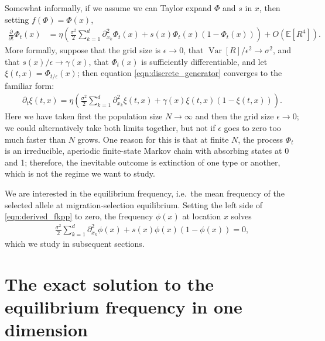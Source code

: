 \documentclass{article}
\DeclareMathOperator{\var}{Var}
\newcommand{\E}{\mathbb{E}}
\begin{document}
Somewhat informally, if we assume we can Taylor expand $\Phi$ and $s$ in $x$, then
setting $f(\Phi) = \Phi(x)$,
\begin{align} 
  \label{eqn:derived_fkpp}
  \frac{\partial}{\partial t} \Phi_t(x)
  &= \eta \left( \frac{\sigma^2}{2} \sum_{k=1}^d \partial_{x_k}^2 \Phi_t(x) + s(x) \Phi_t(x) \left(1-\Phi_t(x)\right) \right) + O(\E[R^4]) .
\end{align} 
More formally, suppose that the grid size is $\epsilon \to 0$, 
that $\var[R]/\epsilon^2 \to \sigma^2$, and that $s(x)/\epsilon \to \gamma(x)$,
that $\Phi_t(x)$ is sufficiently differentiable,
and let $\xi(t,x) = \Phi_{t/\epsilon}(x)$;
then equation \eqref{eqn:discrete_generator} converges to the familiar form:
\begin{align}
  \partial_t \xi(t,x) = \eta \left( \frac{\sigma^2}{2} \sum_{k=1}^d \partial_{x_k}^2 \xi(t,x) + \gamma(x) \xi(t,x) (1-\xi(t,x)) \right) .
\end{align}
Here we have taken first the population size $N \to \infty$ and then the grid size $\epsilon \to 0$;
we could alternatively take both limits together, but not if $\epsilon$ goes to zero too much faster than $N$ grows.
One reason for this is that at finite $N$,
the process $\Phi_t$ is an irreducible, aperiodic finite-state Markov chain with absorbing states at 0 and 1;
therefore, the inevitable outcome is extinction of one type or another,
which is not the regime we want to study.

We are interested in the equilibrium frequency,
i.e.\ the mean frequency of the selected allele at migration-selection equilibrium.
Setting the left side of \eqref{eqn:derived_fkpp} to zero, the frequency $\phi(x)$ at location $x$ solves
\begin{align}
  \label{eqn:general_phi}
  \frac{\sigma^2}{2} \sum_{k=1}^d \partial_{x_k}^2 \phi(x) + s(x) \phi(x) (1-\phi(x)) = 0 ,
\end{align}
which we study in subsequent sections.

\section{The exact solution to the equilibrium frequency in one dimension}
\label{apx:elliptic_integrals}
\end{document}
